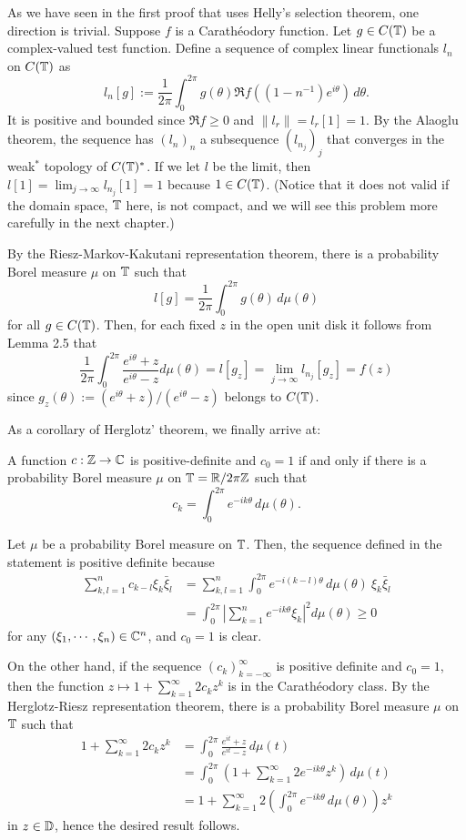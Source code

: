 \documentclass[10pt]{article}
\begin{document}
\begin{pf}
As we have seen in the first proof that uses Helly's selection theorem, one direction is trivial.
Suppose $f$ is a Carath\'eodory function.
Let $g\in C(\mathbb{T})$ be a complex-valued test function.
Define a sequence of complex linear functionals $l_n$ on $C(\mathbb{T})$ as
\[l_n[g]:=\frac1{2\pi}\int_0^{2\pi}g(\theta)\Re f((1-n^{-1})e^{i\theta})\,d\theta.\]
It is positive and bounded since $\Re f\ge0$ and $\|l_r\|=l_r[1]=1$.
By the Alaoglu theorem, the sequence has $(l_n)_n$ a subsequence $(l_{n_j})_j$ that converges in the weak$^*$ topology of $C(\mathbb{T})^*$.
If we let $l$ be the limit, then $l[1]=\lim_{j\to\infty}l_{n_j}[1]=1$ because $1\in C(\mathbb{T})$.
(Notice that it does not valid if the domain space, $\mathbb{T}$ here, is not compact, and we will see this problem more carefully in the next chapter.)

By the Riesz-Markov-Kakutani representation theorem, there is a probability Borel measure $\mu$ on $\mathbb{T}$ such that
\[l[g]=\frac1{2\pi}\int_0^{2\pi}g(\theta)\,d\mu(\theta)\]
for all $g\in C(\mathbb{T})$.
Then, for each fixed $z$ in the open unit disk it follows from Lemma 2.5 that
\[\frac1{2\pi}\int_0^{2\pi}\frac{e^{i\theta}+z}{e^{i\theta}-z}d\mu(\theta)=l[g_z]=\lim_{j\to\infty}l_{n_j}[g_z]=f(z)\]
since $g_z(\theta):=(e^{i\theta}+z)/(e^{i\theta}-z)$ belongs to $C(\mathbb{T})$.
\end{pf}

As a corollary of Herglotz' theorem, we finally arrive at:

\begin{cor}
A function $c:\mathbb{Z}\to\mathbb{C}$ is positive-definite and $c_0=1$ if and only if there is a probability Borel measure $\mu$ on $\mathbb{T}=\mathbb{R}/2\pi\mathbb{Z}$ such that
\[c_k=\int_0^{2\pi}e^{-ik\theta}\,d\mu(\theta).\]
\end{cor}
\begin{pf}
Let $\mu$ be a probability Borel measure on $\mathbb{T}$.
Then, the sequence defined in the statement is positive definite because
\begin{align*}
\sum_{k,l=1}^nc_{k-l}\xi_k\bar\xi_l
&=\sum_{k,l=1}^n\int_0^{2\pi}e^{-i(k-l)\theta}\,d\mu(\theta)\ \xi_k\bar\xi_l\\
&=\int_0^{2\pi}\left|\sum_{k=1}^ne^{-ik\theta}\xi_k\right|^2d\mu(\theta)\ge0
\end{align*}
for any $(\xi_1,\cdots,\xi_n)\in\mathbb{C}^n$, and $c_0=1$ is clear.

On the other hand, if the sequence $(c_k)_{k=-\infty}^\infty$ is positive definite and $c_0=1$, then the function $z\mapsto1+\sum_{k=1}^\infty2c_kz^k$ is in the Carath\'eodory class.
By the Herglotz-Riesz representation theorem, there is a probability Borel measure $\mu$ on $\mathbb{T}$ such that
\begin{align*}
1+\sum_{k=1}^\infty2c_kz^k
&=\int_0^{2\pi}\frac{e^{it}+z}{e^{it}-z}\,d\mu(t)\\
&=\int_0^{2\pi}\left(1+\sum_{k=1}^\infty2e^{-ik\theta}z^k\right)\,d\mu(t)\\
&=1+\sum_{k=1}^\infty2\left(\int_0^{2\pi}e^{-ik\theta}\,d\mu(\theta)\right)z^k
\end{align*}
in $z\in\mathbb{D}$, hence the desired result follows.
\end{pf}
\end{document}
